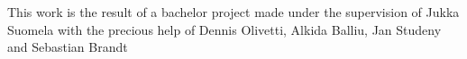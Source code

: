 This work is the result of a bachelor project made under the supervision of Jukka Suomela with the precious help of Dennis Olivetti, Alkida Balliu, Jan Studeny and Sebastian Brandt